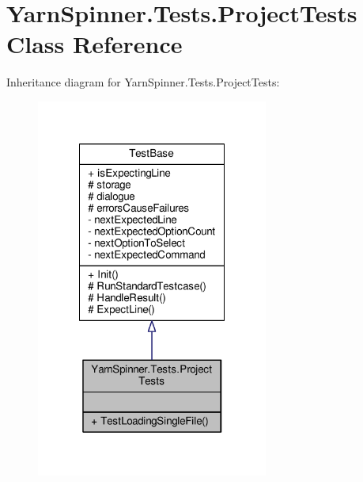 \hypertarget{a00130}{\section{Yarn\-Spinner.\-Tests.\-Project\-Tests Class Reference}
\label{a00130}
}


Inheritance diagram for Yarn\-Spinner.\-Tests.\-Project\-Tests\-:
\nopagebreak
\begin{figure}[H]
\begin{center}
\leavevmode
\includegraphics[width=216pt]{d1/da6/a00738}
\end{center}
\end{figure}


